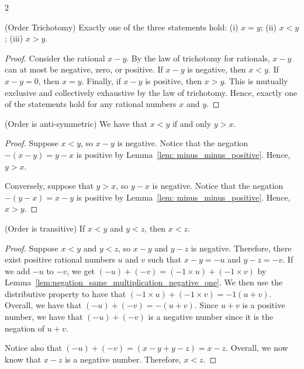 \begin{multicols}{2}
\begin{proposition}
    (Order Trichotomy) Exactly one of the three statements hold:
    (i) $x = y$; (ii) $x < y$; (iii) $x > y.$
\end{proposition}

\begin{proof}
    Consider the rational $x - y$. By the law of trichotomy for rationals, $x-y$ can at most be negative, zero, or positive.
    If $x - y$ is negative, then $x < y.$ If $x -y = 0$, then $x = y.$ Finally, if $x -y$ is positive, then $x >y.$
    This is mutually exclusive and collectively exhaustive by the law of trichotomy.
    Hence, exactly one of the statements hold for any rational numbers $x$ and $y$.
\end{proof}

\begin{proposition}
    (Order is anti-symmetric) We have that $x < y$ if and only $y >x.$
\end{proposition}
\begin{proof}
    Suppose $x <y$, so $x - y$ is negative.
    Notice that the negation $-(x - y) = y - x$ is positive by Lemma~\ref{lem: minus_minus_positive}.
    Hence, $y>x$.

    Conversely, suppose that $y > x$, so $y - x$ is negative.
    Notice that the negation $-(y-x)=x - y$ is positive by Lemma~\ref{lem: minus_minus_positive}.
    Hence, $x > y.$
\end{proof}

\begin{proposition}
    (Order is transitive) If $x < y$ and $y < z$, then $x < z.$
\end{proposition}
\begin{proof}
    Suppose $x < y$ and $y < z$, so $x - y$ and $y - z$ is negative. 
    Therefore, there exist positive rational numbers $u$ and $v$ such that $x - y = -u$ and $y - z=-v.$
    If we add $-u$ to $-v$, we get $(-u) + (-v) = (-1 \times u) + (-1 \times v)$ by Lemma~\ref{lem:negation_same_multiplication_negative_one}.
    We then use the distributive property to have that $(-1 \times u) + (-1 \times v) = -1(u + v).$ 
    Overall, we have that $(-u) + (-v) = -(u + v)$.
    Since $u + v$ is a positive number, we have that $(-u) + (-v)$ is a negative number since it is the negation of $u + v$.
    
    Notice also that $(-u) + (-v) = (x - y + y - z)= x - z.$
    Overall, we now know that $x - z$ is a negative number. Therefore, $x < z.$
\end{proof}


\end{multicols}

